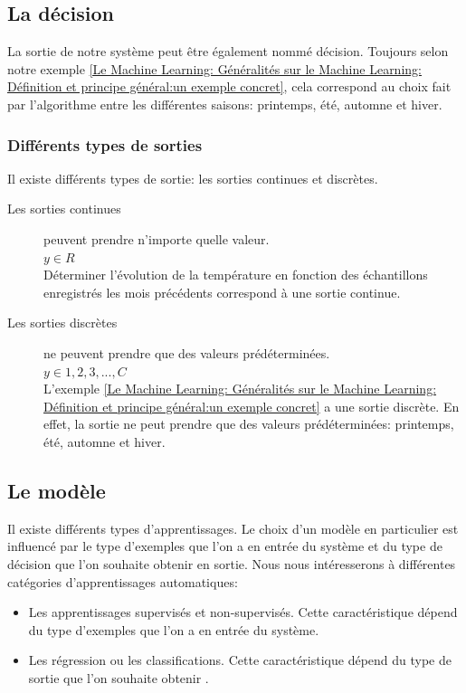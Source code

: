 \subsection{La décision}
\label{Le Machine Learning: Généralités sur le Machine Learning: La décision}
La sortie de notre système peut être également nommé décision. Toujours selon notre exemple \ref{Le Machine Learning: Généralités sur le Machine Learning: Définition et principe général:un exemple concret}, cela correspond au choix fait par l'algorithme entre les différentes saisons: printemps, été, automne et hiver.  


\subsubsection{Différents types de sorties}
Il existe différents types de sortie: les sorties continues et discrètes.

\begin{description}
	\item [Les sorties continues] peuvent prendre n'importe quelle valeur. \\
	 $y \in R$ \\
	 Déterminer l'évolution de la température en fonction des échantillons enregistrés les mois précédents correspond à une sortie continue.
	\item [Les sorties discrètes] ne peuvent prendre que des valeurs prédéterminées. \\
	 $y \in {1, 2, 3, ...,C}$ \\
	 L'exemple \ref{Le Machine Learning: Généralités sur le Machine Learning: Définition et principe général:un exemple concret} a une sortie discrète. En effet, la sortie ne peut prendre que des valeurs prédéterminées: printemps, été, automne et hiver.
\end{description}



\subsection{Le modèle}
\label{Le Machine Learning: Généralités sur le Machine Learning: Le modèle}
Il existe différents types d'apprentissages. Le choix d'un modèle en particulier est influencé par le type d'exemples que l'on a en entrée du système et du type de décision que l'on souhaite obtenir en sortie. Nous nous intéresserons à différentes catégories d'apprentissages automatiques: 
\begin{itemize}
	\item Les apprentissages supervisés et non-supervisés. Cette caractéristique dépend du type d'exemples que l'on a en entrée du système.
	\item Les régression ou les classifications. Cette caractéristique dépend du type de sortie que l'on souhaite obtenir . 
\end{itemize}



